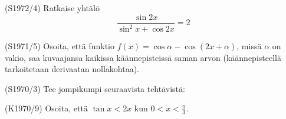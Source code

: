 \begin{tehtava} (S1972/4)
	Ratkaise yhtälö \[\frac{\sin2x}{\sin^2x+\cos2x}=2\]
\end{tehtava}

\begin{tehtava} (S1971/5)
	Osoita, että funktio $f(x)=\cos\alpha-\cos(2x+\alpha)$, missä $\alpha$ on vakio, saa kuvaajansa kaikissa käännepisteissä 
	saman arvon (käännepisteellä tarkoitetaan derivaatan nollakohtaa).
\end{tehtava}

\begin{tehtava} (S1970/3)
	Tee jompikumpi seuraavista tehtävistä:
		\begin{alakohdat}
		\end{alakohdat}
\end{tehtava}

\begin{tehtava} (K1970/9)
	Osoita, että $\tan x<2x$ kun $0<x<\frac{\pi}{3}$.
\end{tehtava}







